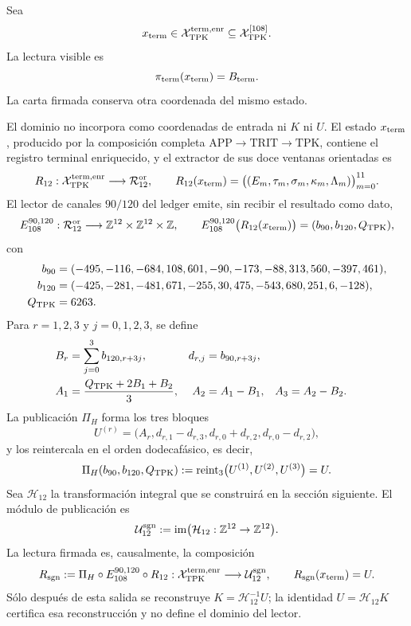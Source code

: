 Sea
\[
 x_{\rm term}\in
 \mathcal X_{\rm TPK}^{\rm term,enr}
 \subseteq\mathcal X_{\rm TPK}^{[108]}.
\]
La lectura visible es
\[
 \pi_{\rm term}(x_{\rm term})=B_{\rm term}.
\]
La carta firmada conserva otra coordenada del mismo estado.

\begin{definition}
\label{p12-83-c10-s1:def:subespacio-firmado-terminal}
El dominio no incorpora como coordenadas de entrada ni \(K\) ni \(U\). El
estado \(x_{\rm term}\), producido por la composición completa
\(\mathrm{APP}\to\mathrm{TRIT}\to\mathrm{TPK}\), contiene el registro
terminal enriquecido, y el extractor de sus doce ventanas orientadas es
\begin{equation}
 R_{12}:\mathcal X_{\rm TPK}^{\rm term,enr}
 \longrightarrow\mathcal R_{12}^{\rm or},
 \qquad
 R_{12}(x_{\rm term})
 =\bigl((E_m,\tau_m,\sigma_m,\kappa_m,\Lambda_m)\bigr)_{m=0}^{11}.
 \label{p12-83-c10-s1:eq:subespacio-firmado-terminal}
\end{equation}
El lector de canales \(90/120\) del ledger emite, sin recibir el resultado
como dato,
\[
 E_{108}^{90,120}:\mathcal R_{12}^{\rm or}
 \longrightarrow\mathbb Z^{12}\times\mathbb Z^{12}\times\mathbb Z,
 \qquad
 E_{108}^{90,120}\bigl(R_{12}(x_{\rm term})\bigr)
 =(b_{90},b_{120},Q_{\rm TPK}),
\]
con
\begin{align*}
 b_{90}={}&(-495,-116,-684,108,601,-90,
             -173,-88,313,560,-397,461),\\
 b_{120}={}&(-425,-281,-481,671,-255,30,
              475,-543,680,251,6,-128),\\
 Q_{\rm TPK}={}&6263.
\end{align*}
Para \(r=1,2,3\) y \(j=0,1,2,3\), se define
\[
\begin{aligned}
 B_r&=\sum_{j=0}^{3}b_{120,r+3j},
 &d_{r,j}&=b_{90,r+3j},\\
 A_1&=\frac{Q_{\rm TPK}+2B_1+B_2}{3},
 &A_2&=A_1-B_1,
 &A_3&=A_2-B_2.
\end{aligned}
\]
La publicación \(\Pi_H\) forma los tres bloques
\[
 U^{(r)}=
 \bigl(A_r,d_{r,1}-d_{r,3},d_{r,0}+d_{r,2},
 d_{r,0}-d_{r,2}\bigr),
\]
y los reintercala en el orden dodecafásico, es decir,
\[
 \Pi_H(b_{90},b_{120},Q_{\rm TPK})
 :=\operatorname{reint}_3\bigl(U^{(1)},U^{(2)},U^{(3)}\bigr)=U.
\]
Sea \(\mathcal H_{12}\) la
transformación integral que se construirá en la sección siguiente. El módulo
de publicación es
\begin{equation}
 \mathcal U_{12}^{\rm sgn}
 :=\operatorname{im}
 \bigl(\mathcal H_{12}:\mathbb Z^{12}\to\mathbb Z^{12}\bigr).
 \label{p12-83-c10-s1:eq:modulo-publicacion-firmada}
\end{equation}
La lectura firmada es, causalmente, la composición
\begin{equation}
 R_{\rm sgn}:=
 \Pi_H\circ E_{108}^{90,120}\circ R_{12}:
 \mathcal X_{\rm TPK}^{\rm term,enr}
 \longrightarrow\mathcal U_{12}^{\rm sgn},
 \qquad
 R_{\rm sgn}(x_{\rm term})=U.
 \label{p12-83-c10-s1:eq:lector-firmado-terminal}
\end{equation}
Sólo después de esta salida se reconstruye
\(K=\mathcal H_{12}^{-1}U\); la identidad
\(U=\mathcal H_{12}K\) certifica esa reconstrucción y no define el dominio
del lector.
\end{definition}

